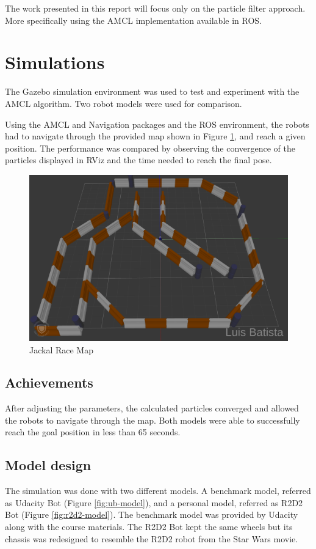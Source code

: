 \documentclass[10pt,journal,compsoc]{IEEEtran}
\begin{document}
The work presented in this report will focus only on the particle filter approach. More specifically using the AMCL implementation available in ROS.


\section{Simulations}

The Gazebo simulation environment was used to test and experiment with the AMCL algorithm. Two robot models were used for comparison. 
 
Using the AMCL and Navigation packages and the ROS environment, the robots had to navigate through the provided map shown in Figure \ref{fig:jackal-map}, and reach a given position. The performance was compared by observing the convergence of the particles displayed in RViz and the time needed to reach the final pose. 

\begin{figure}[H]
  \includegraphics[width=\linewidth]{jackal_map.png}
  \caption{Jackal Race Map}
  \label{fig:jackal-map}
\end{figure}

\subsection{Achievements}

After adjusting the parameters, the calculated particles converged and allowed the robots to navigate through the map. Both models were able to successfully reach the goal position in less than 65 seconds.

\subsection{Model design}
\label{sec-modeldesign}
The simulation was done with two different models. A benchmark model, referred as Udacity Bot (Figure \ref{fig:ub-model}), and a personal model, referred as R2D2 Bot (Figure \ref{fig:r2d2-model}). The benchmark model was provided by Udacity along with the course materials. The R2D2 Bot kept the same wheels but its chassis was redesigned to resemble the R2D2 robot from the Star Wars movie.
\end{document}
